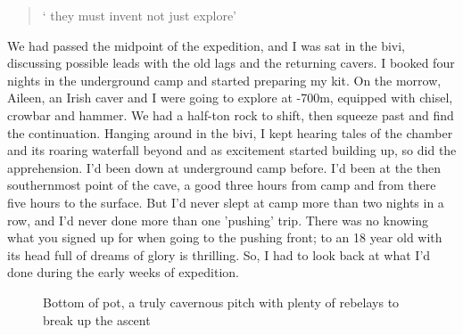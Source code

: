 \begin{quote}` they must invent not just explore'\end{quote}

We had passed the midpoint of the expedition, and I was sat in the bivi, discussing possible leads with the old lags and the returning cavers. I booked four nights in the underground camp and started preparing my kit. On the morrow, Aileen, an Irish caver and I were going to explore at -700m, equipped with chisel, crowbar and hammer. We had a half-ton rock to shift, then squeeze past and find the continuation. Hanging around in the bivi, I kept hearing tales of the chamber and its roaring waterfall beyond and as excitement started building up, so did the apprehension. I'd been down at underground camp before. I'd been at the then southernmost point of the cave, a good three hours from camp and from there five hours to the surface. But I'd never slept at camp  more than two nights in a row, and I'd never done more than one 'pushing' trip. 
There was no knowing what you signed up for when going to the pushing front; to an 18 year old with its head full of dreams of glory is thrilling. So, I had to look back at what I'd done during the early weeks of expedition.

\mydelimiter

\begin{figure}[t!]
\checkoddpage \ifoddpage \forcerectofloat \else \forceversofloat \fi
\centering
{}
\caption{Bottom of \protect{} pot, a truly cavernous pitch with plenty of rebelays to break up the ascent }
\label{Pico}
\end{figure}




